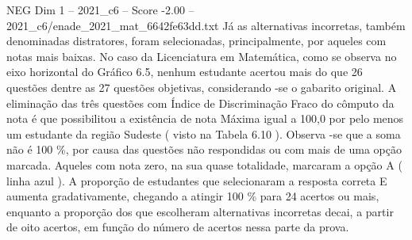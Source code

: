 \begin{textsample}{NEG Dim 1 – 2021\_c6 – Score -2.00 – 2021\_c6/enade\_2021\_mat\_6642fe63dd.txt}
Já as alternativas incorretas, também denominadas distratores, foram selecionadas, principalmente, por aqueles com notas mais baixas.
No caso da Licenciatura em Matemática, como se observa no eixo horizontal do Gráfico 6.5, nenhum estudante acertou mais do que 26 questões dentre as 27 questões objetivas, considerando -se o gabarito original.
A eliminação das três questões com Índice de Discriminação Fraco do cômputo da nota é que possibilitou a existência de nota Máxima igual a 100,0 por pelo menos um estudante da região Sudeste ( visto na Tabela 6.10 ).
Observa -se que a soma não é 100 \%, por causa das questões não respondidas ou com mais de uma opção marcada.
Aqueles com nota zero, na sua quase totalidade, marcaram a opção A ( linha azul ).
A proporção de estudantes que selecionaram a resposta correta E aumenta gradativamente, chegando a atingir 100 \% para 24 acertos ou mais, enquanto a proporção dos que escolheram alternativas incorretas decai, a partir de oito acertos, em função do número de acertos nessa parte da prova.

\end{textsample}
